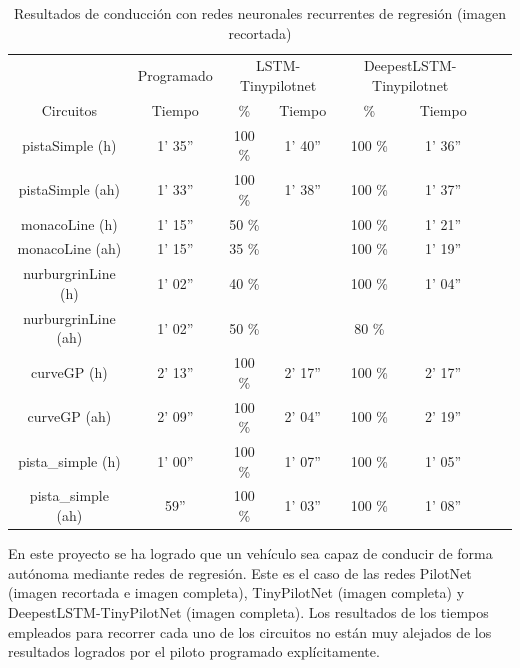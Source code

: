 \begin{table}[H]
\centering
\caption{Resultados de conducción con redes neuronales recurrentes de regresión (imagen recortada)}
\label{resultados_regresion_recurrente_recortada}
\begin{tabular}{c|c|c|c|c|c|c|c|}
\cline{2-6}
                          & \multicolumn{1}{c|}{Programado} & \multicolumn{2}{c|}{LSTM-Tinypilotnet} & \multicolumn{2}{c|}{DeepestLSTM-Tinypilotnet} \\ \cline{1-6} 
                        \multicolumn{1}{|c|}{Circuitos}    & Tiempo       & \%       & Tiempo       & \%        & Tiempo      \\ \hline
\multicolumn{1}{|c|}{pistaSimple (h)}    & 1' 35''     &  100 \%   & 1' 40''    & 100 \%   & 1' 36''        \\ \hline
\multicolumn{1}{|c|}{pistaSimple (ah)}     & 1' 33''    & 100 \%    & 1' 38''   & 100 \%      & 1' 37''  \\ \hline
\multicolumn{1}{|c|}{monacoLine (h)}      & 1' 15''     & 50 \%       &     & 100 \%      & 1' 21''            \\ \hline
\multicolumn{1}{|c|}{monacoLine (ah)}       & 1' 15''     & 35 \%      &      & 100 \%        & 1' 19''         \\ \hline
\multicolumn{1}{|c|}{nurburgrinLine (h)}      & 1' 02''   & 40 \%    &       & 100 \%      & 1' 04''         \\ \hline
\multicolumn{1}{|c|}{nurburgrinLine (ah)}       & 1' 02''    & 50 \%     &        &  80 \%    &          \\ \hline
\multicolumn{1}{|c|}{curveGP (h)}     & 2' 13''     & 100 \%     & 2' 17''    &  100 \%     & 2' 17''             \\ \hline
\multicolumn{1}{|c|}{curveGP (ah)}       & 2' 09''   & 100 \%    & 2' 04''     &  100 \%      & 2' 19''      \\ \hline
\multicolumn{1}{|c|}{pista\_simple (h)}       & 1' 00''       & 100 \%       & 1' 07''  &  100 \%     & 1' 05''    \\ \hline
\multicolumn{1}{|c|}{pista\_simple (ah)}     & 59''    & 100 \%    & 1' 03''      &  100 \%     & 1' 08''         \\ \hline
\end{tabular}
\end{table}



En este proyecto se ha logrado que un vehículo sea capaz de conducir de forma autónoma mediante redes de regresión. Este es el caso de las redes PilotNet (imagen recortada e imagen completa), TinyPilotNet (imagen completa) y DeepestLSTM-TinyPilotNet (imagen completa). Los resultados de los tiempos empleados para recorrer cada uno de los circuitos no están muy alejados de los resultados logrados por el piloto programado explícitamente.\\

